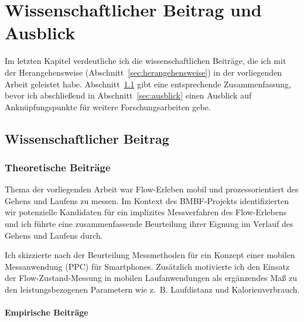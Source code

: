 

\chapter{Wissenschaftlicher Beitrag und Ausblick}

\label{cha:wissenschaftlicher_beitrag_und_ausblick}

Im letzten Kapitel verdeutliche ich die wissenschaftlichen Beiträge, die ich mit der Herangehensweise (Abschnitt~\ref{sec:herangehensweise}) in der vorliegenden Arbeit geleistet habe. Abschnitt~\ref{sec:wissenschaftlicher_beitrag} gibt eine entsprechende Zusammenfassung, bevor ich abschließend in Abschnitt~\ref{sec:ausblick} einen Ausblick auf Anknüpfungspunkte für weitere Forschungsarbeiten gebe.

\section{Wissenschaftlicher Beitrag} 

\label{sec:wissenschaftlicher_beitrag}

\subsection{Theoretische Beiträge} 

\label{sub:theoretische_beitrage}

Thema der vorliegenden Arbeit war Flow-Erleben mobil und prozessorientiert des Gehens und Laufens zu messen. Im Kontext des \acs{BMBF}-Projekts identifizierten wir potenzielle Kandidaten für ein implizites Messverfahren des Flow-Erlebens und ich führte eine zusammenfassende Beurteilung ihrer Eignung im Verlauf des Gehens und Laufens durch. 

Ich skizzierte nach der Beurteilung Messmethoden für ein Konzept einer mobilen Messanwendung (\ac{PPC}) für Smartphones. Zusätzlich motivierte ich den Einsatz der Flow-Zustand-Messung in mobilen Laufanwendungen als ergänzendes Maß zu den leistungsbezogenen Parametern wie z.~B. Laufdistanz und Kalorienverbrauch.

\subsubsection{Empirische Beiträge} 

